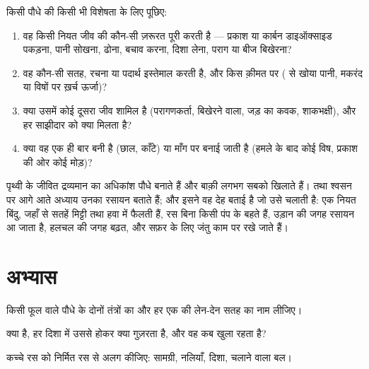 \begin{method}[जड़ जमाए जीवन के किसी अनुकूलन को पढ़ना]\label{met:g12:plant-rooted-life:read}
किसी पौधे की किसी भी विशेषता के लिए पूछिए:
\begin{enumerate}
  \item वह किसी नियत जीव की कौन-सी ज़रूरत पूरी करती है --- प्रकाश या
        कार्बन डाइऑक्साइड पकड़ना, पानी सोखना, ढोना, बचाव करना, दिशा लेना,
        पराग या बीज बिखेरना?
  \item वह कौन-सी सतह, रचना या पदार्थ इस्तेमाल करती है, और किस क़ीमत पर
        ( से खोया पानी, मकरंद या विषों पर ख़र्च ऊर्जा)?
  \item क्या उसमें कोई दूसरा जीव शामिल है (परागणकर्ता, बिखेरने वाला, जड़ का
        कवक, शाकभक्षी), और हर साझीदार को क्या मिलता है?
  \item क्या वह एक ही बार बनी है (छाल, काँटे) या माँग पर बनाई जाती है
        (हमले के बाद कोई विष, प्रकाश की ओर कोई मोड़)?
\end{enumerate}
\end{method}

\begin{remark}[जीवन का आधा हिस्सा, खड़े-खड़े]\label{rem:g12:plant-rooted-life:half}
पृथ्वी के जीवित द्रव्यमान का अधिकांश पौधे बनाते हैं और बाक़ी लगभग सबको
खिलाते हैं।  तथा श्वसन पर आगे आते अध्याय उनका रसायन बताते हैं;
और इसने वह देह बताई है जो उसे चलाती है: एक नियत बिंदु, जहाँ से सतहें मिट्टी
तथा हवा में फैलती हैं, रस बिना किसी पंप के बहते हैं, उड़ान की जगह रसायन आ
जाता है, हलचल की जगह बढ़त, और सफ़र के लिए जंतु काम पर रखे जाते हैं।
\end{remark}

\section{अभ्यास}

\begin{exercise}[$\star$]\label{exo:g12:plant-rooted-life:1}
किसी फूल वाले पौधे के दोनों तंत्रों का और हर एक की लेन-देन सतह का नाम
लीजिए।
\end{exercise}

\begin{exercise}[$\star$]\label{exo:g12:plant-rooted-life:2}
 क्या है, हर दिशा में उससे होकर क्या गुज़रता है, और वह कब खुला रहता
है?
\end{exercise}

\begin{exercise}[$\star$]\label{exo:g12:plant-rooted-life:3}
कच्चे रस को निर्मित रस से अलग कीजिए: सामग्री, नलियाँ, दिशा, चलाने वाला बल।
\end{exercise}

